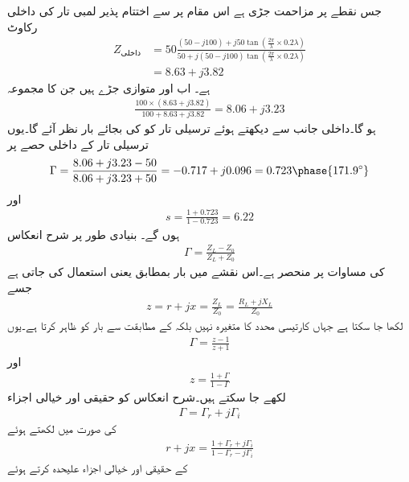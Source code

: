 جس نقطے پر  مزاحمت جڑی ہے اس مقام پر  سے اختتام پذیر  لمبی تار کی داخلی رکاوٹ
\begin{align*}
Z_{\text{داخلی}} &= 
50 \frac{(50-j100) +j 50 \tan \left( \frac{2\pi}{\lambda} \times 0.2 \lambda\right)}{50+j (50-j100)  \tan\left(  \frac{2\pi}{\lambda} \times 0.2 \lambda\right)}\\
&=8.63+j3.82
\end{align*}
ہے۔ اب  اور  متوازی جڑے ہیں جن کا مجموعہ
\begin{align*}
\frac{100\times(8.63+j3.82)}{100+8.63+j3.82}=8.06+j3.23
\end{align*}
ہو گا۔داخلی جانب سے دیکھتے ہوئے ترسیلی تار کو  کی بجائے  بار نظر آئے گا۔یوں ترسیلی تار کے داخلی حصے پر
\begin{align*}
\Gamma=\frac{8.06+j3.23-50}{8.06+j3.23+50}=-0.717+j0.096=0.723 \phase{171.9^{\circ}}
\end{align*} 
اور
\begin{align*}
s=\frac{1+0.723}{1-0.723}=6.22
\end{align*}
ہوں گے۔
 بنیادی طور پر شرح انعکاس
\begin{align*}
\Gamma=\frac{Z_L-Z_0}{Z_L+Z_0}
\end{align*}
کی مساوات پر منحصر ہے۔اس نقشے میں بار بمطابق  یعنی   استعمال کی جاتی ہے جسے
\begin{align*}
z=r+jx=\frac{Z_L}{Z_0}=\frac{R_L+j X_L}{Z_0}
\end{align*}
لکھا جا سکتا ہے جہاں  کارتیسی محدد کا متغیرہ نہیں بلکہ  کے مطابقت سے بار کو ظاہر کرتا ہے۔یوں
\begin{align*}
\Gamma=\frac{z-1}{z+1}
\end{align*}
  اور
\begin{align}\label{مساوات_ترسیلی_انعکاس_بالمقابل_قدرتی_رکاوٹ}
z=\frac{1+\Gamma}{1-\Gamma}
\end{align}
لکھے جا سکتے ہیں۔شرح انعکاس کو حقیقی اور خیالی اجزاء
\begin{align*}
\Gamma=\Gamma_r+j \Gamma_i
\end{align*}
کی صورت میں لکھتے ہوئے
\begin{align*}
r+j x =\frac{1+\Gamma_r+j \Gamma_i}{1-\Gamma_r-j\Gamma_i}
\end{align*} 
کے حقیقی اور خیالی اجزاء علیحدہ کرتے ہوئے
